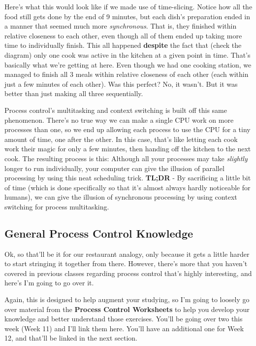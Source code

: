 \documentclass[english, 10pt]{article}
\begin{document}
Here's what this would look like if we made use of time-slicing. Notice how all the food still gets done by the end of 9 minutes, but each dish's preparation ended in a manner that seemed much more \textit{synchronous}. That is, they finished within relative closeness to each other, even though all of them ended up taking more time to individually finish. This all happened \textbf{despite} the fact that (check the diagram) only one cook was active in the kitchen at a given point in time. That's basically what we're getting at here. Even though we had one cooking station, we managed to finish all 3 meals within relative closeness of each other (each within just a few minutes of each other). Was this perfect? No, it wasn't. But it was better than just making all three sequentially.\newline

Process control's multitasking and context switching is built off this same phenomenon. There's no true way we can make a single CPU work on more processes than one, so we end up allowing each process to use the CPU for a tiny amount of time, one after the other. In this case, that's like letting each cook work their magic for only a few minutes, then handing off the kitchen to the next cook. The resulting process is this: Although all your processes may take \textit{slightly} longer to run individually, your computer can give the illusion of parallel processing by using this neat scheduling trick. \textbf{TL;DR} - By sacrificing a little bit of time (which is done specifically so that it's almost always hardly noticeable for humans), we can give the illusion of synchronous processing by using context switching for process multitasking.

\subsection{General Process Control Knowledge}

Ok, so that'll be it for our restaurant analogy, only because it gets a little harder to start stringing it together from there. However, there's more that you haven't covered in previous classes regarding process control that's highly interesting, and here's I'm going to go over it.\newline

Again, this is designed to help augment your studying, so I'm going to loosely go over material from the \textbf{Process Control Worksheets} to help you develop your knowledge and better understand those exercises. You'll be going over two this week (Week 11) and I'll link them here. You'll have an additional one for Week 12, and that'll be linked in the next section.
\end{document}
